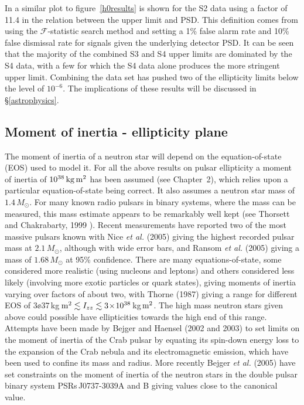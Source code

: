 In \cite{Abbott:2005} a similar plot to figure~\ref{h0results} is shown for the S2 data using a
factor of 11.4 in the relation between the upper limit and PSD. This definition comes from using the
$\mathcal{F}$-statistic search method and setting a 1\% false alarm rate and 10\% false dismissal
rate for signals given the underlying detector PSD. It can be seen that the majority of the combined
S3 and S4 upper limits are dominated by the S4 data, with a few for which the S4 data alone
produces the more stringent upper limit. Combining the data set has pushed two of the ellipticity
limits below the level of $10^{-6}$. The implications of these results will be discussed in
\S\ref{astrophysics}.

\subsection{Moment of inertia - ellipticity plane}
The moment of inertia of a neutron star will depend on the equation-of-state (EOS) used to model it.
For all the above results on pulsar ellipticity a moment of inertia of $10^{38}\,{\rm kg}\,{\rm
m}^2$ has been assumed (see Chapter~2), which relies upon a particular equation-of-state being
correct. It also assumes a neutron star mass of $1.4\,M_{\odot}$. For many known radio pulsars in
binary systems, where the mass can be measured, this mass estimate appears to be remarkably well
kept (see Thorsett and Chakrabarty, 1999 \cite{Thorsett:1999}). Recent measurements have reported
two of the most massive pulsars known with Nice {\it et al.} (2005) \cite{Nice:2005} giving the
highest recorded pulsar mass at $2.1\,M_{\odot}$, although with wide error bars, and Ransom {\it et
al.} (2005) \cite{Ransom:2005} giving a mass of $1.68\,M_{\odot}$ at 95\% confidence.
There are many equations-of-state, some considered more realistic (using nucleons and leptons) and
others considered less likely (involving more exotic particles or quark states), giving moments of
inertia varying over factors of about two, with Thorne (1987) \cite{300Years} giving a range for
different EOS of $3\ee{37}$\,kg\,${\rm m}^2 \lesssim I_{zz} \lesssim 3\!\times\!10^{38}$\,kg\,${\rm m}^2$. The
high mass neutron stars given above could possible have ellipticities towards the high end of this
range. Attempts have been made by Bejger and Haensel (2002 and 2003) \cite{Bejger:2002, Bejger:2003}
to set limits on the moment of inertia of the Crab pulsar by equating its spin-down energy loss to
the expansion of the Crab nebula and its electromagnetic emission, which have been used to confine
its mass and radius. More recently Bejger {\it et al.} (2005) \cite{Bejger:2005} have set
constraints on the moment of inertia of the neutron stars in the double pulsar binary system
PSRs\,J0737-3039A and B giving values close to the canonical value.

